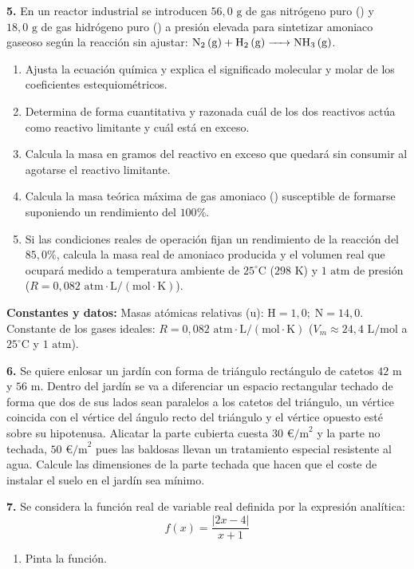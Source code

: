 \documentclass[11pt,a4paper]{article}
\begin{document}
\vspace{0.4cm}
\noindent\textbf{5.} En un reactor industrial se introducen $56{,}0\text{ g}$ de gas nitrógeno puro () y $18{,}0\text{ g}$ de gas hidrógeno puro () a presión elevada para sintetizar amoniaco gaseoso según la reacción sin ajustar: $\ce{N2 (g) + H2 (g) -> NH3 (g)}$.
\begin{enumerate}[label=\textbf{\alph*)}, leftmargin=2em, itemsep=6pt]
    \item Ajusta la ecuación química y explica el significado molecular y molar de los coeficientes estequiométricos.
    \item Determina de forma cuantitativa y razonada cuál de los dos reactivos actúa como reactivo limitante y cuál está en exceso.
    \item Calcula la masa en gramos del reactivo en exceso que quedará sin consumir al agotarse el reactivo limitante.
    \item Calcula la masa teórica máxima de gas amoniaco () susceptible de formarse suponiendo un rendimiento del $100\%$.
    \item Si las condiciones reales de operación fijan un rendimiento de la reacción del $85{,}0\%$, calcula la masa real de amoniaco producida y el volumen real que ocupará medido a temperatura ambiente de $25^\circ\text{C}$ ($298\text{ K}$) y $1\text{ atm}$ de presión ($R = 0{,}082\text{ atm}\cdot\text{L}/(\text{mol}\cdot\text{K})$).
\end{enumerate}
\noindent\textbf{Constantes y datos:} Masas atómicas relativas ($\text{u}$): $\mathrm{H} = 1{,}0;\; \mathrm{N} = 14{,}0$. Constante de los gases ideales: $R = 0{,}082\text{ atm}\cdot\text{L}/(\text{mol}\cdot\text{K})$ ($V_m \approx 24{,}4\text{ L/mol}$ a $25^\circ\text{C}$ y $1\text{ atm}$).

\newpage

\noindent\textbf{6.} Se quiere enlosar un jardín con forma de triángulo rectángulo de catetos $42\text{ m}$ y $56\text{ m}$. Dentro del jardín se va a diferenciar un espacio rectangular techado de forma que dos de sus lados sean paralelos a los catetos del triángulo, un vértice coincida con el vértice del ángulo recto del triángulo y el vértice opuesto esté sobre su hipotenusa. Alicatar la parte cubierta cuesta $30\text{ €/m}^2$ y la parte no techada, $50\text{ €/m}^2$ pues las baldosas llevan un tratamiento especial resistente al agua. Calcule las dimensiones de la parte techada que hacen que el coste de instalar el suelo en el jardín sea mínimo.

\vspace{0.4cm}
\noindent\textbf{7.} Se considera la función real de variable real definida por la expresión analítica:
\[
f(x) = \frac{|2x - 4|}{x + 1}
\]
\begin{enumerate}[label=\textbf{\alph*)}, leftmargin=2em]
    \item Pinta la función.
\end{enumerate}
\end{document}
